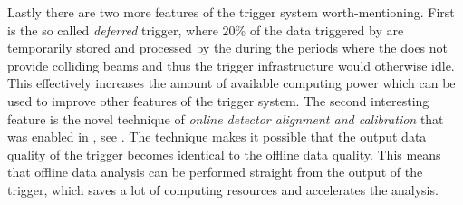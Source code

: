 Lastly there are two more features of the \lhcb trigger system worth-mentioning. First is the so called
{\it deferred} trigger, where $20\%$ of the data triggered by \lzero are temporarily stored and processed by the \hlt
during the periods where the \lhc does not provide colliding beams and thus the \lhcb trigger infrastructure
would otherwise idle. This effectively increases the amount of available computing power which can be used
to improve other features of the trigger system. The second interesting feature is the novel technique of
{\it online detector alignment and calibration} that was enabled in \runtwo, see \cite{Aaij:2016rxn}.
The technique makes it possible that the output data quality of the trigger becomes identical to the offline data quality.
This means that offline data analysis can be performed straight from the output of the trigger, which saves
a lot of computing resources and accelerates the analysis.
